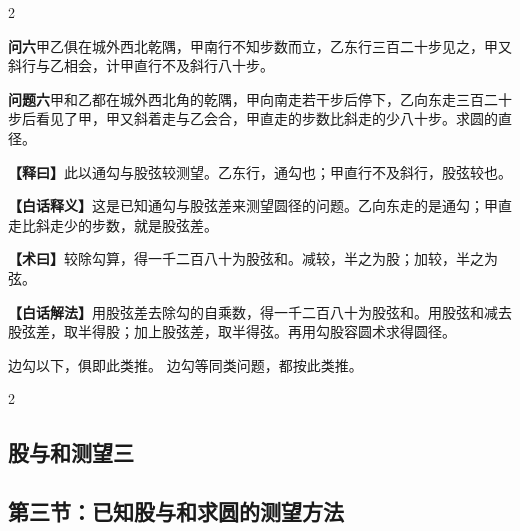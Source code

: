 \documentclass[11pt,a4paper]{article}
\newcommand{\WenQuestion}[1]{\textbf{\textcolor{classicalcolor}{#1}}}
\newcommand{\BaiQuestion}[1]{\textbf{\textcolor{moderncolor}{#1}}}
\newcommand{\WenExplain}{\textcolor{classicalcolor}{\textbf{【释曰】}}}
\newcommand{\BaiExplain}{\textcolor{moderncolor}{\textbf{【白话释义】}}}
\newcommand{\WenMethod}{\textcolor{classicalcolor}{\textbf{【术曰】}}}
\newcommand{\BaiMethod}{\textcolor{moderncolor}{\textbf{【白话解法】}}}
\begin{document}
\begin{paracol}{2}

\switchcolumn*
\begin{tcolorbox}[colback=red!3,colframe=red!30!black,boxrule=0.3pt]
\WenQuestion{问六}\quad 甲乙俱在城外西北乾隅，甲南行不知步数而立，乙东行三百二十步见之，甲又斜行与乙相会，计甲直行不及斜行八十步。
\end{tcolorbox}
\switchcolumn
\begin{tcolorbox}[colback=blue!3,colframe=blue!30!black,boxrule=0.3pt]
\BaiQuestion{问题六}\quad 甲和乙都在城外西北角的乾隅，甲向南走若干步后停下，乙向东走三百二十步后看见了甲，甲又斜着走与乙会合，甲直走的步数比斜走的少八十步。求圆的直径。
\end{tcolorbox}

\switchcolumn*
\begin{tcolorbox}[colback=red!5,colframe=red!30!black,boxrule=0.3pt]
\WenExplain\quad 此以通勾与股弦较测望。乙东行，通勾也；甲直行不及斜行，股弦较也。
\end{tcolorbox}
\switchcolumn
\begin{tcolorbox}[colback=blue!5,colframe=blue!30!black,boxrule=0.3pt]
\BaiExplain\quad 这是已知通勾与股弦差来测望圆径的问题。乙向东走的是通勾；甲直走比斜走少的步数，就是股弦差。
\end{tcolorbox}

\switchcolumn*
\begin{tcolorbox}[colback=red!5,colframe=red!40!black,boxrule=0.3pt]
\WenMethod\quad 较除勾算，得一千二百八十为股弦和。减较，半之为股；加较，半之为弦。
\end{tcolorbox}
\switchcolumn
\begin{tcolorbox}[colback=blue!5,colframe=blue!40!black,boxrule=0.3pt]
\BaiMethod\quad 用股弦差去除勾的自乘数，得一千二百八十为股弦和。用股弦和减去股弦差，取半得股；加上股弦差，取半得弦。再用勾股容圆术求得圆径。
\end{tcolorbox}

\switchcolumn*
\small 边勾以下，俱即此类推。
\switchcolumn
\small 边勾等同类问题，都按此类推。

\end{paracol}

\vspace{0.5em}

\begin{paracol}{2}
\subsection*{\textcolor{sectioncolor}{股与和测望三}}
\switchcolumn
\subsection*{\textcolor{sectioncolor}{第三节：已知股与和求圆的测望方法}}
\end{paracol}
\end{document}
